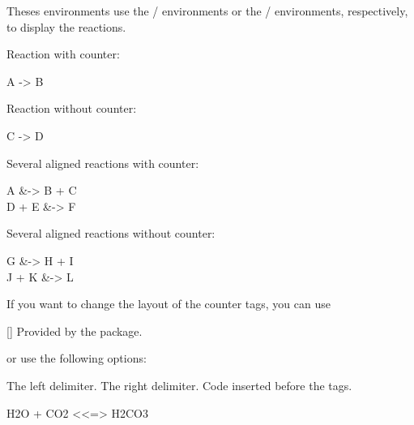 \documentclass{chemmacros-manual}
\begin{document}
Theses environments use the / environments or
the / environments, respectively, to display the
reactions.

\begin{example}
  Reaction with counter:
  \begin{reaction}
    A -> B
  \end{reaction}
\end{example}

\begin{example}
  Reaction without counter:
  \begin{reaction*}
    C -> D
  \end{reaction*}
\end{example}

\begin{example}
  Several aligned reactions with counter:
  \begin{reactions}
    A     &-> B + C \\
    D + E &-> F
  \end{reactions}
\end{example}

\begin{example}
  Several aligned reactions without counter:
  \begin{reactions*}
    G     &-> H + I \\
    J + K &-> L
  \end{reactions*}
\end{example}

If you want to change the layout of the counter tags, you can use
\begin{commands}
  []
    Provided by the  package.
\end{commands}
or use the following options:
\begin{options}
  \Initial{\cs*{\{}}
    The left delimiter.
  \Initial{\cs*{\}}}
    The right delimiter.
  \Initial
    Code inserted before the tags.
\end{options}

\begin{example}
  \begin{reaction}
    H2O + CO2 <<=> H2CO3
  \end{reaction}
\end{example}
\end{document}
